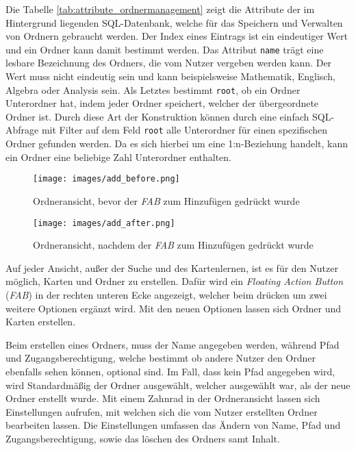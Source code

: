 Die Tabelle \ref{tab:attribute_ordnermanagement} zeigt die Attribute der im Hintergrund liegenden SQL-Datenbank, welche für das Speichern und Verwalten von Ordnern gebraucht werden. Der Index eines Eintrags ist ein eindeutiger Wert und ein Ordner kann damit bestimmt werden. Das Attribut \texttt{name} trägt eine lesbare Bezeichnung des Ordners, die vom Nutzer vergeben werden kann. Der Wert muss nicht eindeutig sein und kann beispielsweise Mathematik, Englisch, Algebra oder Analysis sein. Als Letztes bestimmt \texttt{root}, ob ein Ordner Unterordner hat, indem jeder Ordner speichert, welcher der übergeordnete Ordner ist. Durch diese Art der Konstruktion können durch eine einfach SQL-Abfrage mit Filter auf dem Feld \texttt{root} alle Unterordner für einen spezifischen Ordner gefunden werden. Da es sich hierbei um eine 1:n-Beziehung handelt, kann ein Ordner eine beliebige Zahl Unterordner enthalten.

\begin{figure}[ht!]
  \centering
  \begin{minipage}[b]{0.4\textwidth}
    \texttt{[image: images/add\_before.png]}
    \caption{Ordneransicht, bevor der \textit{FAB} zum Hinzufügen gedrückt wurde}
    \label{add_before}
  \end{minipage}
  \hfill
  \begin{minipage}[b]{0.4\textwidth}
    \texttt{[image: images/add\_after.png]}
    \caption{Ordneransicht, nachdem der \textit{FAB} zum Hinzufügen gedrückt wurde}
  \end{minipage}
\end{figure}

Auf jeder Ansicht, außer der Suche und des Kartenlernen, ist es für den Nutzer möglich, Karten und Ordner zu erstellen. Dafür wird ein \textit{Floating Action Button} (\textit{FAB}) in der rechten unteren Ecke angezeigt, welcher beim drücken um zwei weitere Optionen ergänzt wird. Mit den neuen Optionen lassen sich Ordner und Karten erstellen. 

Beim erstellen eines Ordners, muss der Name angegeben werden, während Pfad und Zugangsberechtigung, welche bestimmt ob andere Nutzer den Ordner ebenfalls sehen können, optional sind. Im Fall, dass kein Pfad angegeben wird, wird Standardmäßig der Ordner ausgewählt, welcher ausgewählt war, als der neue Ordner erstellt wurde. Mit einem Zahnrad in der Ordneransicht lassen sich Einstellungen aufrufen, mit welchen sich die vom Nutzer erstellten Ordner bearbeiten lassen. Die Einstellungen umfassen das Ändern von Name, Pfad und Zugangsberechtigung, sowie das löschen des Ordners samt Inhalt.

